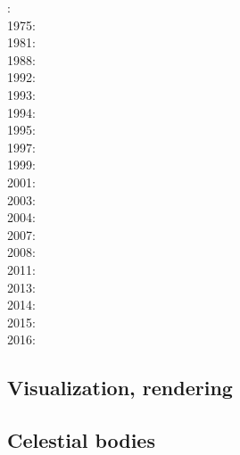 {\scriptsize
{}: \cite{bers72}\\
1975: \cite{dixo75}\\
1981: \cite{brpo81}\\
1988: \cite{sccm88}\\
1992: \cite{vayv92}\cite{zaju92}\cite{wein92}\cite{wesc92}\cite{veja92}\\
1993: \cite{kesb93}\cite{nabr93}\cite{potp93}\cite{povp93}\cite{vasv93}\cite{pocp93}
      \cite{popt93}\cite{wein93}\cite{vayv93}\\
1994: \cite{wepo94}\\
1995: \cite{wepo95}\cite{bisc95}\cite{wepo95}\\
1997: \cite{wein97}\\
1999: \cite{drdv99}\\
2001: \cite{kapo01}\cite{drvc01}\\
2003: \cite{geur03}\cite{vavd03}\\
2004: \cite{gepm04}\cite{istt04}\cite{geur04}\\
2007: \cite{gebu07}\\
2008: \cite{buge08}\cite{zlfd08}\cite{mohc98}\\
2011: \cite{ellw11}\cite{pege11}\\
2013: \cite{fusc13}\\
2014: \cite{feka14b}\\
2015: \cite{feka15}\cite{fuks15}\\
2016: \cite{cakp16}
}

\subsection{Visualization, rendering}

{\scriptsize
\noindent
\cite{faha}
\cite{chzy08}
\cite{stmt08}
\cite{cram18}
}

\subsection{Celestial bodies}

